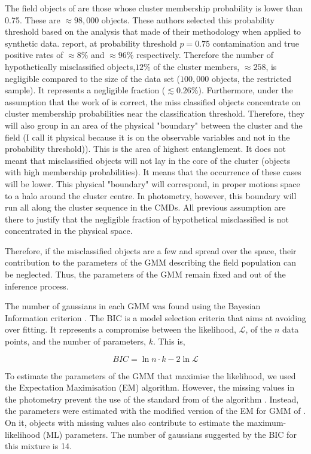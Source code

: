The field objects of \citet{Bouy2015} are those whose cluster membership probability is lower than 0.75. These are $\approx98,000$ objects. These authors selected this probability threshold based on the analysis that \citet{Sarro2014} made of their methodology when applied to synthetic data. \citet{Sarro2014} report, at probability threshold $p=0.75$ contamination and true positive rates of $\approx 8\%$ and $ \approx96\%$ respectively. Therefore the number of hypothetically misclassified objects,$12\%$ of the cluster members, $\approx 258 $, is negligible compared to the size of the data set ($100,000$ objects, the restricted sample). It represents a negligible fraction ($ \lesssim0.26$\%). Furthermore, under the assumption that the work of \citet{Sarro2014} is correct, the miss classified objects concentrate on cluster membership probabilities near the classification threshold. Therefore, they will also group in an area of the physical "boundary" between the cluster and the field (I call it physical because it is on the observable variables and not in the probability threshold)). This is the area of highest entanglement. It does not meant that misclassified objects will not lay in the core of the cluster (objects with high membership probabilities). It means that the occurrence of these cases will be lower.  This physical "boundary" will correspond, in proper motions space to a halo around the cluster centre. In photometry, however, this boundary will run all along the cluster sequence in the CMDs. All previous assumption are there to justify that the negligible fraction of hypothetical misclassified is not concentrated in the physical space. 

Therefore, if the misclassified objects are a few and spread over the space, their contribution to the parameters of the GMM describing the field population can be neglected. Thus, the parameters of the GMM remain fixed and out of the inference process. 

The number of gaussians in each GMM was found using the Bayesian Information criterion \cite[BIC,][]{Schwarz1978}. The BIC is a model selection criteria that aims at avoiding over fitting. It represents a compromise between the likelihood, $\mathcal{L}$, of the $n$ data points, and the number of parameters, $k$. This is,

\begin{equation}
BIC = \ln{n}\cdot k - 2 \ln{\mathcal{L}}
\end{equation}

To estimate the parameters of the GMM that maximise the likelihood, we used the Expectation Maximisation (EM) algorithm. However, the missing values in the photometry prevent the use of the standard from of the algorithm \cite[see for example Chapter 9 of][]{Bishop2006}.
Instead, the parameters were estimated with the modified version of the EM for GMM of \citet{McMichael1996}. On it, objects with missing values also contribute to estimate the maximum-likelihood (ML) parameters. The number of gaussians suggested by the BIC for this mixture is 14. 


